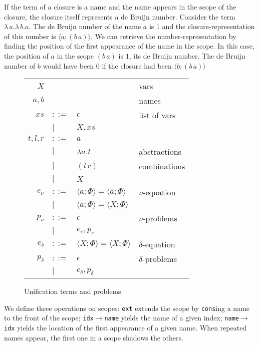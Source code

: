 \documentclass{easychair}
\newcommand{\clos}[2] {
\langle #1; #2 \rangle
}
\newcommand{\app}[2] {
(#1\, #2)
}
\begin{document}
If the term of a closure is a name and the name appears in the scope
of the closure,
the closure itself represents a de Bruijn number.
Consider the term
$\lambda\,a.\lambda\,b.a$. The de Bruijn number of the name $a$ is $1$
and the closure-representation of this number is $\clos{a}{(b\,a)}$.
We can retrieve the number-representation by finding the position of
the first appearance of the name in the scope. In this case, the
position of $a$ in the scope $(b\,a)$ is $1$, its de Bruijn
number. The de Bruijn number of $b$ would have been $0$
if the closure had been $\clos{b}{(b\,a)}$

\begin{wrapfigure}{r}{0.5\textwidth}
\caption{Unification terms and problems\label{table:new-terms}}
\begin{tabular}{r l l l}
  \\
$X$ & & & vars \\
$a,b$ & & & names \\
$xs$ & $::=$ & $\epsilon$& list of vars \\
& $|$&$X,xs$ &\\
$t,l,r$ & $::=$ & $a$ & \\
& $|$ & $\lambda a.t$ & abstractions \\
& $|$ & $\app{l}{r}$ & combinations \\
& $|$ & $X$ & \\
$e_\nu$& $::=$ & $\clos{a}{\Phi} = \clos{a}{\Phi}$ & $\nu$-equation \\
 & $|$ &$\clos{a}{\Phi} = \clos{X}{\Phi}$ \\
$p_\nu$& $::=$ & $\epsilon$ & $\nu$-problems \\
 & $|$ & $e_\nu, p_\nu$ \\
$e_\delta$& $::=$& $\clos{X}{\Phi} = \clos{X}{\Phi}$ & $\delta$-equation \\
$p_\delta$& $::=$ & $\epsilon$ & $\delta$-problems \\
 & $|$ & $e_\delta, p_\delta$
\end{tabular}
\end{wrapfigure}

We define three operations on scopes: \texttt{ext}
extends the scope by \texttt{cons}ing a name to the front of the scope;
\texttt{idx$\rightarrow$name} yields the name of a given index;
\texttt{name$\rightarrow$idx} yields the location of the first
appearance of a given name.
When repeated names appear, the
first one in a scope shadows the others.
\end{document}
